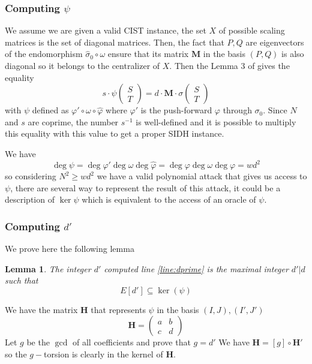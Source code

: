 \documentclass[12pt,a4paper]{article}
\newtheorem{lemma}{Lemma}
\begin{document}
				\subsubsection{Computing $\psi$}
				We assume we are given a valid CIST instance, the set $X$ of possible scaling matrices is the
				set of diagonal matrices. Then, the fact that $P,Q$ are eigenvectors of the
				endomorphism $\widehat\sigma_0\circ\omega$ ensure that its matrix  $\mathbf M$ in the basis $(P,Q)$
			is also diagonal so it belongs to the centralizer of $X$. Then the Lemma 3 of \cite{polyCIST} gives
			the equality  \[
			s\cdot\psi\begin{pmatrix} S \\ T \end{pmatrix} = d\cdot\mathbf M\cdot\sigma\begin{pmatrix}
		S \\ T \end{pmatrix} 
			\] 
			with $\psi$ defined as $\varphi'\circ\omega\circ\widehat\varphi$ where $\varphi'$ is the
			push-forward $\varphi$ through $\sigma_0$. 
			Since $N$ and $s$ are coprime, the number $s^{-1}$ is well-defined and it is possible to multiply
			this equality with this value to get a proper SIDH instance.

			We have $$\deg\psi=\deg\varphi'\deg\omega\deg\widehat\varphi=\deg\varphi\deg\omega\deg\varphi=wd^{2}$$
			so considering $N^2\geq wd^2$ we have a valid polynomial attack that gives us access to $\psi$,
			there are several way to represent the result of this attack, it could be a description of
			$\ker\psi$ which is equivalent to the access of an oracle of $\psi$.

			
			\subsubsection{Computing $d'$}
			We prove here the following lemma
			\begin{lemma}
				The integer $d'$ computed line \ref{line:dprime} is the maximal integer $d'|d$ such that\[
				E[d']\subseteq \ker(\psi)
			\] 

			\end{lemma}
			We have the matrix $\mathbf H$ that represents $\psi$ in the basis $(I,J),(I',J')$ 
			 \[
				 \mathbf H = \begin{pmatrix} a &  b \\ c & d \end{pmatrix} 
			\] 
			Let $g$ be the $\gcd$ of all coefficients and prove that $g = d'$
			We have $\mathbf H	= [g]\circ\mathbf H'$ so the $g-$torsion is clearly in the kernel of $\mathbf
			H$.
			
\end{document}
